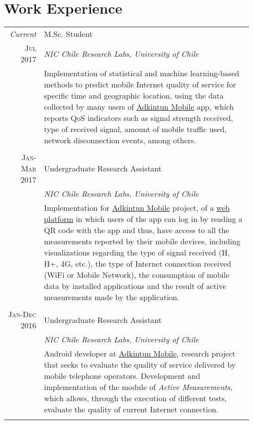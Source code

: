\documentclass[a4paper,10pt]{article}
\begin{document}
\section{Work Experience}
\begin{tabular}{r|p{13cm}}
 \emph{Current} & M.Sc. Student \\\textsc{Jul 2017}&\emph{NIC Chile Research Labs, University of Chile}\\&\footnotesize{Implementation of statistical and machine learning-based methods to predict mobile Internet quality of service for specific time and geographic location, using the data collected by many users of \href{http://adkintunmobile.cl}{Adkintun Mobile} app, which reports QoS indicators such as signal strength received, type of received signal, amount of mobile traffic used, network disconnection events, among others.}\\\multicolumn{2}{c}{} \\
 
 \textsc{Jan-Mar 2017} & Undergraduate Research Assistant \\&\emph{NIC Chile Research Labs, University of Chile}\\&\footnotesize{Implementation for \href{http://adkintunmobile.cl}{Adkintun Mobile} project, of a \href{http://adkintunmobile.cl/auth.html}{web platform} in which users of the app can log in by reading a QR code with the app and thus, have access to all the measurements reported by their mobile devices, including visualizations regarding the type of signal received (H, H+, 4G, etc.), the type of Internet connection received (WiFi or Mobile Network), the consumption of mobile data by installed applications and the result of active measurements made by the application.}\\\multicolumn{2}{c}{} \\

\textsc{Jan-Dec 2016} & Undergraduate Research Assistant\\&\emph{NIC Chile Research Labs, University of Chile}\\&\footnotesize{Android developer at \href{http://adkintunmobile.cl}{Adkintun Mobile}, research project that seeks to evaluate the quality of service delivered by mobile telephone operators. Development and implementation of the module of \textit{Active Measurements}, which allows, through the execution of different tests, evaluate the quality of current Internet connection.}\\\multicolumn{2}{c}{} \\
\end{tabular}
\end{document}
